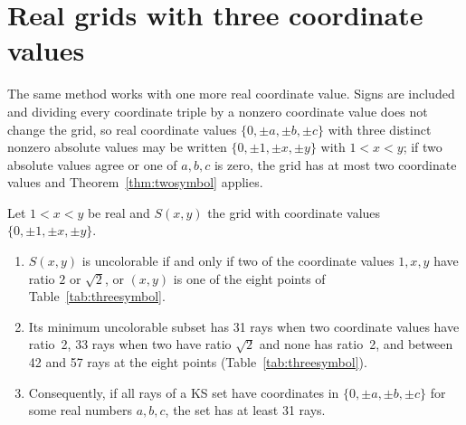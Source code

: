 \section{Real grids with three coordinate values}\label{sec:threesymbol}

The same method works with one more real coordinate value.  Signs are included and dividing
every coordinate triple by a nonzero coordinate value does not change the grid, so real coordinate values
$\{0,\pm a,\pm b,\pm c\}$ with three distinct nonzero absolute values may be written
$\{0,\pm1,\pm x,\pm y\}$ with $1<x<y$; if two absolute values agree or one of $a,b,c$ is zero,
the grid has at most two coordinate values and Theorem~\ref{thm:twosymbol} applies.

\begin{theorem}\label{thm:threesymbol}
Let $1<x<y$ be real and $S(x,y)$ the grid with coordinate values $\{0,\pm1,\pm x,\pm y\}$.
\begin{enumerate}[label=(\roman*)]
\item $S(x,y)$ is uncolorable if and only if two of the coordinate values $1,x,y$ have ratio $2$ or
$\sqrt2$, or $(x,y)$ is one of the eight points of Table~\ref{tab:threesymbol}.
\item Its minimum uncolorable subset has 31 rays when two coordinate values have ratio~2, 33 rays
when two have ratio $\sqrt2$ and none has ratio~2, and between 42 and 57 rays at the eight points
(Table~\ref{tab:threesymbol}).
\item Consequently, if all rays of a KS set have coordinates in $\{0,\pm a,\pm b,\pm c\}$ for some
real numbers $a,b,c$, the set has at least 31 rays.
\end{enumerate}
\end{theorem}

